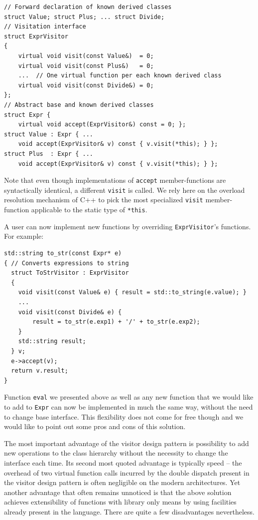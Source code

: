 \documentclass[preprint]{sigplanconf}
\makeatletter
\DeclareRobustCommand{\code}[1]{{\lstinline[breaklines=false,escapechar=@]{#1}}}
\makeatother
\begin{document}
\begin{lstlisting}
// Forward declaration of known derived classes
struct Value; struct Plus; ... struct Divide;
// Visitation interface
struct ExprVisitor
{
    virtual void visit(const Value&)  = 0;
    virtual void visit(const Plus&)   = 0;
    ...  // One virtual function per each known derived class
    virtual void visit(const Divide&) = 0;
};
// Abstract base and known derived classes
struct Expr { 
    virtual void accept(ExprVisitor&) const = 0; };
struct Value : Expr { ...
    void accept(ExprVisitor& v) const { v.visit(*this); } };
struct Plus  : Expr { ...
    void accept(ExprVisitor& v) const { v.visit(*this); } };
\end{lstlisting}

Note that even though implementations of \code{accept} member-functions are 
syntactically identical, a different \code{visit} is called. We rely here on the 
overload resolution mechanism of C++ to pick the most specialized \code{visit} 
member-function applicable to the static type of \code{*this}. 


A user can now implement new functions by overriding \code{ExprVisitor}'s 
functions. For example:

\begin{lstlisting}
std::string to_str(const Expr* e)
{ // Converts expressions to string
  struct ToStrVisitor : ExprVisitor
  {
    void visit(const Value& e) { result = std::to_string(e.value); }
    ...
    void visit(const Divide& e) { 
        result = to_str(e.exp1) + '/' + to_str(e.exp2); 
    }
    std::string result;
  } v;
  e->accept(v);
  return v.result;
}
\end{lstlisting}

Function \code{eval} we presented above as well as any new function that we 
would like to add to \code{Expr} can now be implemented in much the same way, 
without the need to change base interface. This flexibility does not come for 
free though and we would like to point out some pros and cons of this solution.

The most important advantage of the visitor design pattern is possibility to add 
new operations to the class hierarchy without the necessity to change the 
interface each time. Its second most quoted advantage is typically speed -- the 
overhead of two virtual function calls incurred by the double dispatch present 
in the visitor design pattern is often negligible on the modern architectures. 
Yet another advantage that often remains unnoticed is that the above solution 
achieves extensibility of functions with library only means by using facilities 
already present in the language. There are quite a few disadvantages nevertheless.
\end{document}
